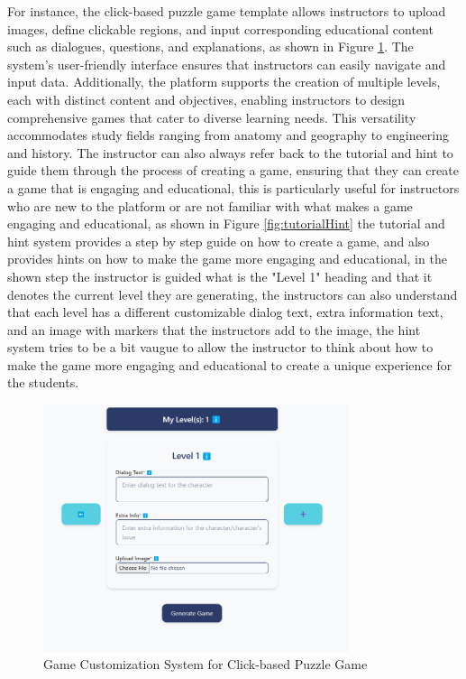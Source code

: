 For instance, the click-based puzzle game template allows instructors to upload images, define clickable regions, and input corresponding educational content such as dialogues, questions, and explanations, as shown in Figure \ref{fig:customizationClickPuzzle}. The system’s user-friendly interface ensures that instructors can easily navigate and input data. Additionally, the platform supports the creation of multiple levels, each with distinct content and objectives, enabling instructors to design comprehensive games that cater to diverse learning needs. This versatility accommodates study fields ranging from anatomy and geography to engineering and history. The instructor can also always refer back to the tutorial and hint to guide them through the process of creating a game, ensuring that they can create a game that is engaging and educational, this is particularly useful for instructors who are new to the platform or are not familiar with what makes a game engaging and educational, as shown in Figure \ref{fig:tutorialHint} the tutorial and hint system provides a step by step guide on how to create a game, and also provides hints on how to make the game more engaging and educational, in the shown step the instructor is guided what is the "Level 1" heading and that it denotes the current level they are generating, the instructors can also understand that each level has a different customizable dialog text, extra information text, and an image with markers that the instructors add to the image, the hint system tries to be a bit vaugue to allow the instructor to think about how to make the game more engaging and educational to create a unique experience for the students.  

\begin{figure}
	\centering
	\includegraphics[width=0.8\textwidth]{figures/Diagnose_Game/Instructor_Portal_Diagnose_Game.png}
	\caption{Game Customization System for Click-based Puzzle Game}
	\label{fig:customizationClickPuzzle}
\end{figure}

